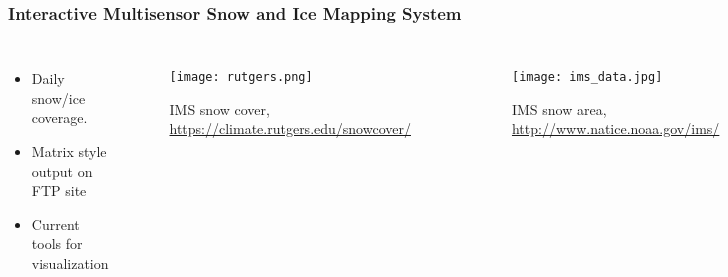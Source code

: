\begin{frame}
\frametitle{Interactive Multisensor Snow and Ice Mapping System}
\begin{columns}


\begin{itemize}
    \item Daily snow/ice coverage. 
    \item Matrix style output on FTP site
    \item Current tools for visualization
\end{itemize}

\begin{figure}
    \centering
    \begin{minipage}{.85\columnwidth}
    \texttt{[image: rutgers.png]}
    \caption{\tiny{IMS snow cover, \url{https://climate.rutgers.edu/snowcover/}}}
    \end{minipage}
\end{figure}


\begin{figure}
    \centering
    \begin{minipage}{.75\columnwidth}
    \texttt{[image: ims\_data.jpg]}
    \caption{\tiny{IMS snow area, \url{http://www.natice.noaa.gov/ims/}}}
    \end{minipage}
\end{figure}
\vspace*{-.5cm}
\underline{\textbf{Research topics}}
\begin{itemize}
    \item Calculate grid area?
    \item Estimate snow/ice coverage in $km^2$
    \item Estimated error vs other products?
\end{itemize}
\end{columns}
\end{frame}

